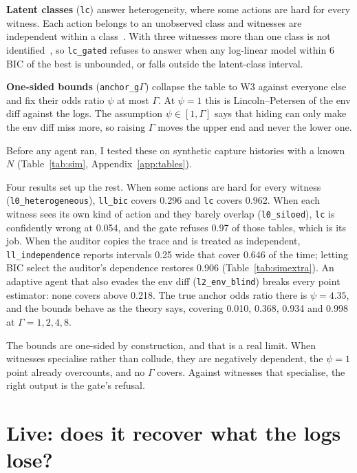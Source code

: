 \documentclass[11pt]{article}
\begin{document}
\textbf{Latent classes} (\texttt{lc}) answer heterogeneity, where some actions are
hard for every witness. Each action belongs to an unobserved class and witnesses
are independent within a class~\citep{manriquevallier2016lcmcr}. With three
witnesses more than one class is not identified~\citep{aleshinguendel2020}, so
\texttt{lc\_gated} refuses to answer when any log-linear model within 6 BIC of the
best is unbounded, or falls outside the latent-class interval.

\textbf{One-sided bounds} (\texttt{anchor\_g}$\Gamma$) collapse the table to W3
against everyone else and fix their odds ratio $\psi$ at most $\Gamma$. At
$\psi = 1$ this is Lincoln--Petersen of the env diff against the logs. The
assumption $\psi \in [1, \Gamma]$ says that hiding can only make the env diff miss
more, so raising $\Gamma$ moves the upper end and never the lower one.

Before any agent ran, I tested these on synthetic capture histories with a known
$N$ (Table~\ref{tab:sim}, Appendix~\ref{app:tables}).


Four results set up the rest. When some actions are hard for every witness
(\texttt{l0\_heterogeneous}), \texttt{ll\_bic} covers 0.296 and \texttt{lc} covers
0.962. When each witness sees its own kind of action and they barely overlap
(\texttt{l0\_siloed}), \texttt{lc} is confidently wrong at 0.054, and the gate
refuses 0.97 of those tables, which is its job. When the auditor copies the trace
and is treated as independent, \texttt{ll\_independence} reports intervals 0.25
wide that cover 0.646 of the time; letting BIC select the auditor's dependence
restores 0.906 (Table~\ref{tab:simextra}). An adaptive agent that also evades the env diff
(\texttt{l2\_env\_blind}) breaks every point estimator: none covers above 0.218.
The true anchor odds ratio there is $\psi = 4.35$, and the bounds behave as the
theory says, covering 0.010, 0.368, 0.934 and 0.998 at $\Gamma = 1, 2, 4, 8$.


The bounds are one-sided by construction, and that is a real limit. When witnesses
specialise rather than collude, they are negatively dependent, the $\psi = 1$
point already overcounts, and no $\Gamma$ covers. Against witnesses that
specialise, the right output is the gate's refusal.

\section{Live: does it recover what the logs lose?}
\label{sec:live}
\end{document}

